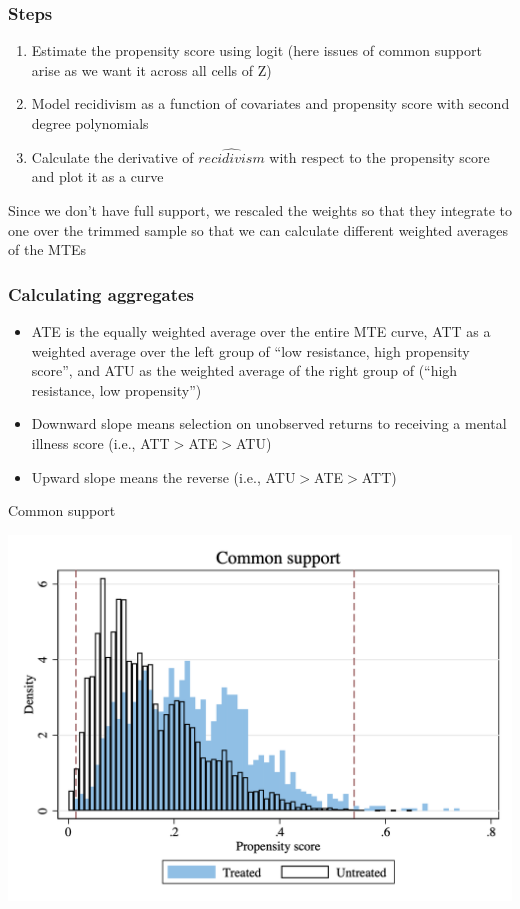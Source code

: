 \documentclass{beamer}
\begin{document}
\begin{frame}
\frametitle{Steps}

\begin{enumerate}
\item Estimate the propensity score using logit (here issues of common support arise as we want it across all cells of Z)
\item Model recidivism as a function of covariates and propensity score with second degree polynomials
\item Calculate the derivative of $\widehat{recidivism}$ with respect to the propensity score and plot it as a curve
\end{enumerate}

\bigskip

Since we don't have full support, we rescaled the weights so that they integrate to one over the trimmed sample so that we can calculate different weighted averages of the MTEs


\end{frame}



\begin{frame}
\frametitle{Calculating aggregates}

\begin{itemize}
\item ATE is the equally weighted average over the entire MTE curve, ATT as a weighted average over the left group of ``low resistance, high propensity score'', and ATU as the weighted average of the right group of (``high resistance, low propensity'')
\item Downward slope means selection on unobserved returns to receiving a mental illness score (i.e., ATT$>$ATE$>$ATU)
\item Upward slope means the reverse (i.e., ATU$>$ATE$>$ATT)
\end{itemize}

\end{frame}

\begin{frame}{Common support}

    \includegraphics[width=\textwidth]{./lecture_includes/common_support_recid.png}

\end{frame}
\end{document}
